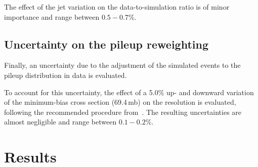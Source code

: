The effect of the jet \pt variation on the data-to-simulation ratio is of minor importance and range between $0.5-0.7\%$.


\section*{Uncertainty on the pileup reweighting}
Finally, an uncertainty due to the adjustment of the simulated events to the pileup distribution in data is evaluated.

To account for this uncertainty, the effect of a 5.0\% up- and downward variation of the minimum-bias cross section (69.4\,mb) on the resolution is evaluated, following the recommended procedure from~\cite{bib:CMS:PileUpReweighting}.
The resulting uncertainties are almost negligible and range between $0.1-0.2\%$.

\FloatBarrier
\chapter{Results}
\label{res:ch:results}

